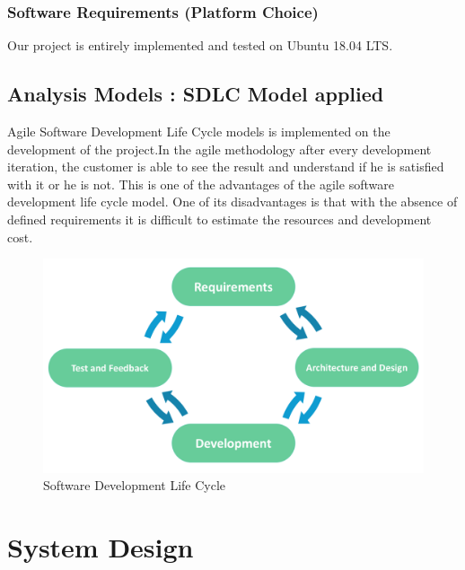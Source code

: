 \documentclass[oneside,a4paper,12pt]{report}
\begin{document}
\subsection{Software Requirements (Platform Choice)}
Our project is entirely implemented and tested on Ubuntu 18.04 LTS.

\section{Analysis Models : SDLC Model applied}
Agile Software Development Life Cycle models is implemented on the development of the project.In the agile methodology after every development iteration, the customer is able to see the result and understand if he is satisfied with it or he is not. This is one of the advantages of the agile software development life cycle model. One of its disadvantages is that with the absence of defined requirements it is difficult to estimate the resources and development cost.\\
\begin{figure}[!htbp]
    \includegraphics[width=\textwidth]{SDLC.png}
	\caption{Software Development Life Cycle}
\end{figure}







\chapter{System Design}
\end{document}
